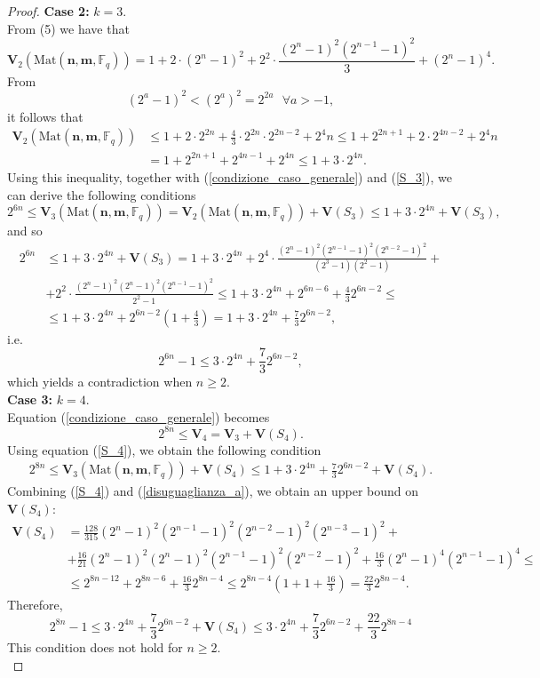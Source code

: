 \documentclass[11pt]{amsart}
\theoremstyle{definition}
\begin{document}
\begin{proof}
\textbf{Case 2:} $k=3$.\\
From (5) we have that
\[
\mathbf{V}_2(\text{Mat}(\textbf{n},\textbf{m},\mathbb{F}_q))=1+2\cdot(2^n-1)^2+2^2\cdot\frac{(2^n-1)^2(2^{n-1}-1)^2}{3}+(2^n-1)^4.
\]
From
\begin{equation}\label{disuguaglianza_a}
(2^a-1)^2<(2^a)^2=2^{2a}\ \ \ \forall a>-1,
\end{equation}
it follows that
\[
\begin{aligned}
\mathbf{V}_2(\text{Mat}(\textbf{n},\textbf{m},\mathbb{F}_q))&\leq 1+2\cdot 2^{2n}+\frac{4}{3}\cdot2^{2n}\cdot2^{2n-2}+2^4n\leq 1+2^{2n+1}+2\cdot2^{4n-2}+2^4n\\&=1+2^{2n+1}+2^{4n-1}+2^{4n}\leq1+3\cdot2^{4n}.
\end{aligned}
\]
Using this inequality, together with (\ref{condizione_caso_generale}) and (\ref{S_3}), we can derive the following conditions
\[
2^{6n}\leq\mathbf{V}_3(\text{Mat}(\textbf{n},\textbf{m},\mathbb{F}_q))=\mathbf{V}_2(\text{Mat}(\textbf{n},\textbf{m},\mathbb{F}_q))+\mathbf{V}(S_3)\leq 1+3\cdot2^{4n}+\textbf{V}(S_3),
\]
and so
\[
	\begin{aligned}
	2^{6n}&\leq 1+3\cdot2^{4n}+\textbf{V}(S_3)=1+3\cdot2^{4n}+2^4\cdot\frac{(2^n-1)^2(2^{n-1}-1)^2(2^{n-2}-1)^2}{(2^3-1)(2^2-1)}+\\&+2^2\cdot\frac{(2^n-1)^2(2^n-1)^2(2^{n-1}-1)^2}{2^2-1}\leq 1+3\cdot2^{4n}+2^{6n-6}+\frac{4}{3}2^{6n-2}\leq\\&\leq1+3\cdot2^{4n}+2^{6n-2}\left(1+\frac{4}{3}\right)=1+3\cdot2^{4n}+\frac{7}{3}2^{6n-2},
\end{aligned}
\]
i.e.
\[
2^{6n}-1\leq3\cdot2^{4n}+\frac{7}{3}2^{6n-2},
\]
which yields a contradiction when $n\geq2$.\\

\textbf{Case 3:} $k=4$.\\
Equation (\ref{condizione_caso_generale}) becomes
\[
2^{8n}\leq\textbf{V}_4=\textbf{V}_3+\textbf{V}(S_4).
\]
Using equation (\ref{S_4}), we obtain the following condition
\[
\begin{aligned}
2^{8n}\leq \mathbf{V}_3(\text{Mat}(\textbf{n},\textbf{m},\mathbb{F}_q))+\mathbf{V}(S_4)\leq1+ 3\cdot2^{4n}+\frac{7}{3}2^{6n-2}+\mathbf{V}(S_4).
\end{aligned}
\]
Combining (\ref{S_4}) and (\ref{disuguaglianza_a}), we obtain an upper bound on $\mathbf{V}(S_4)$:
\[
\begin{aligned}
\mathbf{V}(S_4)&=\frac{128}{315}(2^n-1)^2(2^{n-1}-1)^2(2^{n-2}-1)^2(2^{n-3}-1)^2+\\&+\frac{16}{21}(2^n-1)^2(2^n-1)^2(2^{n-1}-1)^2(2^{n-2}-1)^2+\frac{16}{3}(2^n-1)^4(2^{n-1}-1)^4\leq\\&\leq2^{8n-12}+2^{8n-6}+\frac{16}{3}2^{8n-4}\leq2^{8n-4}\left(1+1+\frac{16}{3}\right)=\frac{22}{3}2^{8n-4}.
\end{aligned}
\]
Therefore,
\[
2^{8n}-1\leq3\cdot2^{4n}+\frac{7}{3}2^{6n-2}+\textbf{V}(S_4)\leq 3\cdot2^{4n}+\frac{7}{3}2^{6n-2}+\frac{22}{3}2^{8n-4}
\]
This condition does not hold for $n\geq2$.\\


\end{proof}
\end{document}
